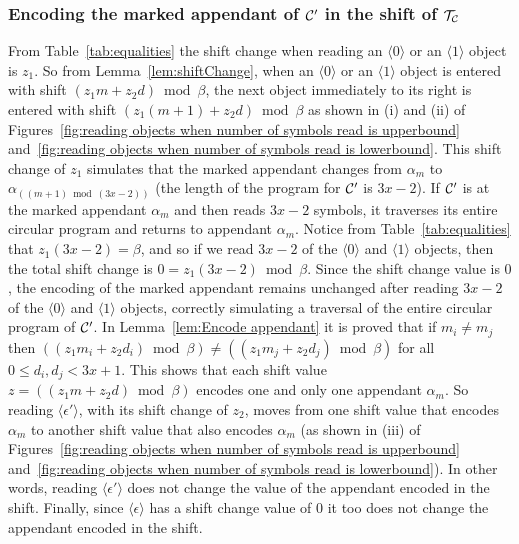 \documentclass[11pt]{article} \usepackage{amsfonts,amsmath,amssymb,amsthm}
\newcommand{\tne}[1]{\ensuremath{\langle #1\rangle}}
\newcommand{\encodeOne}{\tne{1}}
\newcommand{\encodeZero}{\tne{0}}
\newcommand{\encodeDeletion}{\tne{\epsilon}}
\newcommand{\encodeDeletionPrime}{\tne{\epsilon'}}
\begin{document}
\subsubsection{Encoding the marked appendant of $\mathcal{C}'$ in the shift of $\mathcal{T_{\mathcal{C}}}$}\label{sec:Encoding the marked appendant} 
From Table~\ref{tab:equalities} the shift change when reading an $\encodeZero$ or an $\encodeOne$ object is $z_1$. So from Lemma~\ref{lem:shiftChange}, when an $\encodeZero$ or an $\encodeOne$ object is entered with shift $(z_1m+z_2d)\bmod\beta$, the next object immediately to its right is entered with shift $(z_1(m+1)+z_2d)\bmod\beta$ as shown in (i) and (ii) of Figures~\ref{fig:reading objects when number of symbols read is upperbound} and~\ref{fig:reading objects when number of symbols read is lowerbound}.
This shift change of $z_1$ simulates that the marked appendant changes from $\alpha_{m}$ to $\alpha_{((m+1)\bmod (3x-2))}$ (the length of the program for $\mathcal{C}'$ is $3x-2$). 
If $\mathcal{C'}$ is at the marked appendant $\alpha_m$ and then reads $3x-2$ symbols, it traverses its entire circular program and returns to appendant $\alpha_m$. 
Notice from Table~\ref{tab:equalities} that $z_1(3x-2)=\beta$, and so if we read $3x-2$ of the $\encodeZero$ and $\encodeOne$ objects, then the total shift change is $0=z_1(3x-2)\bmod\beta$.
Since the shift change value is $0$, the encoding of the marked appendant remains unchanged after reading $3x-2$ of the $\encodeZero$ and $\encodeOne$ objects, correctly simulating a traversal of the entire circular program of $\mathcal{C}'$.
In Lemma~\ref{lem:Encode appendant} it is proved that if $m_i\neq m_j$ then $((z_1m_i+z_2d_i)\bmod\beta)\neq ((z_1m_j+z_2d_j)\bmod\beta)$ for all $0\leqslant d_i,d_j<3x+1$.
This shows that each shift value $z=((z_1m+z_2d)\bmod\beta)$ encodes one and only one appendant $\alpha_{m}$. So reading $\encodeDeletionPrime$, with its shift change of $z_2$, moves from one shift value that encodes $\alpha_{m}$ to another shift value that also encodes $\alpha_{m}$ (as shown in (iii) of Figures~\ref{fig:reading objects when number of symbols read is upperbound} and~\ref{fig:reading objects when number of symbols read is lowerbound}). In other words, reading $\encodeDeletionPrime$ does not change the value of the appendant encoded in the shift. Finally, since $\encodeDeletion$ has a shift change value of 0 it too does not change the appendant encoded in the shift.
\end{document}
